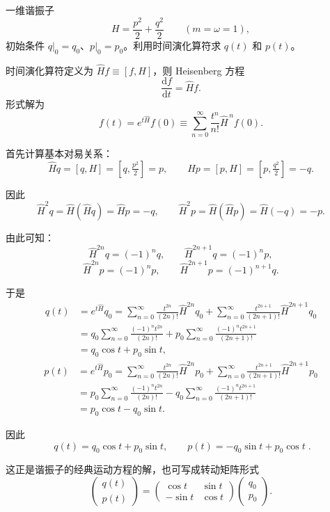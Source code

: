\begin{question}
一维谐振子
\[
H = \frac{p^2}{2} + \frac{q^2}{2}\qquad (m=\omega=1),
\]
初始条件 \(q|_0=q_0\)、\(p|_0=p_0\)。利用时间演化算符求 \(q(t)\) 和 \(p(t)\)。
\begin{solution}
时间演化算符定义为 \(\hat H f \equiv [f,H]\)，则 Heisenberg 方程
\[
\frac{\mathrm d f}{\mathrm d t} = \hat H f.
\]
形式解为
\[
f(t) = e^{t\hat H} f(0) \equiv \sum_{n=0}^\infty \frac{t^n}{n!}\hat H^{\,n} f(0).
\]

首先计算基本对易关系：
\[
\hat H q = [q, H] = [q, \tfrac{p^2}{2}] = p,
\qquad
\hat H p = [p, H] = [p, \tfrac{q^2}{2}] = -q.
\]

因此
\[
\hat H^2 q = \hat H(\hat H q) = \hat H p = -q,
\qquad
\hat H^2 p = \hat H(\hat H p) = \hat H(-q) = -p.
\]

由此可知：
\[
\hat H^{2n} q = (-1)^n q,\qquad
\hat H^{2n+1} q = (-1)^n p,
\]
\[
\hat H^{2n} p = (-1)^n p,\qquad
\hat H^{2n+1} p = (-1)^{n+1} q.
\]

于是
\[
\begin{aligned}
q(t) &= e^{t\hat H} q_0 = \sum_{n=0}^\infty \frac{t^{2n}}{(2n)!}\hat H^{2n} q_0
+ \sum_{n=0}^\infty \frac{t^{2n+1}}{(2n+1)!}\hat H^{2n+1} q_0 \\
&= q_0\sum_{n=0}^\infty \frac{(-1)^n t^{2n}}{(2n)!}
+ p_0\sum_{n=0}^\infty \frac{(-1)^n t^{2n+1}}{(2n+1)!} \\
&= q_0\cos t + p_0\sin t,
\end{aligned}
\]
\[
\begin{aligned}
p(t) &= e^{t\hat H} p_0 = \sum_{n=0}^\infty \frac{t^{2n}}{(2n)!}\hat H^{2n} p_0
+ \sum_{n=0}^\infty \frac{t^{2n+1}}{(2n+1)!}\hat H^{2n+1} p_0 \\
&= p_0\sum_{n=0}^\infty \frac{(-1)^n t^{2n}}{(2n)!}
- q_0\sum_{n=0}^\infty \frac{(-1)^n t^{2n+1}}{(2n+1)!} \\
&= p_0\cos t - q_0\sin t.
\end{aligned}
\]

因此
\[
\boxed{\;q(t) = q_0\cos t + p_0\sin t,\qquad
p(t) = -q_0\sin t + p_0\cos t\;}.
\]

这正是谐振子的经典运动方程的解，也可写成转动矩阵形式
\[
\begin{pmatrix} q(t) \\ p(t) \end{pmatrix}
= \begin{pmatrix} \cos t & \sin t \\ -\sin t & \cos t \end{pmatrix}
\begin{pmatrix} q_0 \\ p_0 \end{pmatrix}.
\]

\end{solution}
\end{question}

